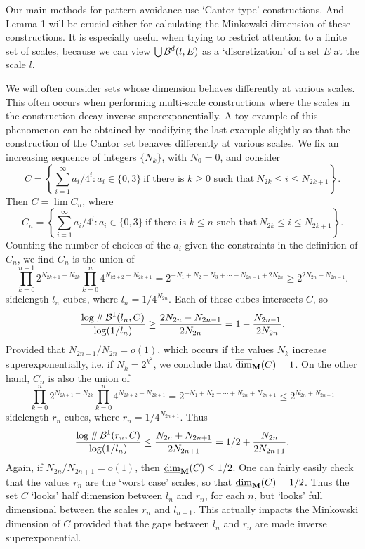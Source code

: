 Our main methods for pattern avoidance use `Cantor-type' constructions. And Lemma 1 will be crucial either for calculating the Minkowski dimension of these constructions. It is especially useful when trying to restrict attention to a finite set of scales, because we can view $\bigcup \operatorname{\mathcal{B}}^d(l,E)$ as a `discretization' of a set $E$ at the scale $l$.

\begin{example}
	We will often consider sets whose dimension behaves differently at various scales. This often occurs when performing multi-scale constructions where the scales in the construction decay inverse superexponentially. A toy example of this phenomenon can be obtained by modifying the last example slightly so that the construction of the Cantor set behaves differently at various scales. We fix an increasing sequence of integers $\{ N_k \}$, with $N_0 = 0$, and consider
	\[ C = \left\{ \sum_{i = 1}^\infty a_i/4^i : a_i \in \{ 0, 3 \}\ \text{if there is $k \geq 0$ such that}\ N_{2k} \leq i \leq N_{2k+1} \right\}. \]
	Then $C = \lim C_n$, where
	\[ C_n = \left\{ \sum_{i = 1}^\infty a_i/4^i : a_i \in \{ 0, 3 \}\ \text{if there is $k \leq n$ such that}\ N_{2k} \leq i \leq N_{2k+1} \right\}. \]
	Counting the number of choices of the $a_i$ given the constraints in the definition of $C_n$, we find $C_n$ is the union of
	\[ \prod_{k = 0}^{n-1} 2^{N_{2k+1} - N_{2k}} \prod_{k = 0}^n 4^{N_{k2+2} - N_{2k+1}} = 2^{-N_1+N_2-N_3+\cdots-N_{2n-1}+2N_{2n}} \geq 2^{2N_{2n} - N_{2n-1}}. \]
	sidelength $l_n$ cubes, where $l_n = 1/4^{N_{2n}}$. Each of these cubes intersects $C$, so
	\[ \frac{\log \# \operatorname{\mathcal{B}}^1(l_n,C)}{\log(1/l_n)} \geq \frac{2N_{2n} - N_{2n-1}}{2N_{2n}} = 1 - \frac{N_{2n-1}}{2N_{2n}}. \]
	Provided that $N_{2n-1}/N_{2n} = o(1)$, which occurs if the values $N_k$ increase superexponentially, i.e. if $N_k = 2^{k^2}$, we conclude that $\operatorname{\overline{\dim}_{\mathbf{M}}}(C) = 1$. On the other hand, $C_n$ is also the union of
	\[ \prod_{k = 0}^n 2^{N_{2k+1} - N_{2k}} \prod_{k = 0}^n 4^{N_{2k+2} - N_{2k+1}} = 2^{-N_1+N_2-\cdots+N_{2n}+N_{2n+1}} \leq 2^{N_{2n} + N_{2n+1}} \]
	sidelength $r_n$ cubes, where $r_n = 1/4^{N_{2n+1}}$. Thus
	\[ \frac{\log \# \operatorname{\mathcal{B}}^1(r_n,C)}{\log(1/l_n)} \leq \frac{N_{2n} + N_{2n+1}}{2N_{2n+1}} = 1/2 + \frac{N_{2n}}{2N_{2n+1}}. \]
	Again, if $N_{2n}/N_{2n+1} = o(1)$, then $\operatorname{\underline{\dim}_{\mathbf{M}}}(C) \leq 1/2$. One can fairly easily check that the values $r_n$ are the `worst case' scales, so that $\operatorname{\underline{\dim}_{\mathbf{M}}}(C) = 1/2$. Thus the set $C$ `looks' half dimension between $l_n$ and $r_n$, for each $n$, but `looks' full dimensional between the scales $r_n$ and $l_{n+1}$. This actually impacts the Minkowski dimension of $C$ provided that the gaps between $l_n$ and $r_n$ are made inverse superexponential.
\end{example}

